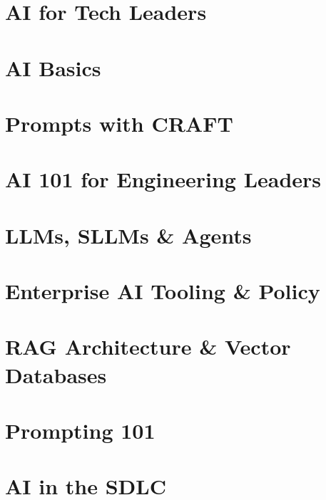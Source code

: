 \section[Intro]{AI for Tech Leaders}


\section[Core]{AI Basics}



\section[Prompts]{Prompts with CRAFT}


\section[AI101]{AI 101 for Engineering Leaders}


\section[LLMAgents]{LLMs, SLLMs \& Agents}


\section[Tooling]{Enterprise AI Tooling \& Policy}


\section[RAG]{RAG Architecture \& Vector Databases}


\section[Prompting]{Prompting 101}


\section[SDLC]{AI in the SDLC}



